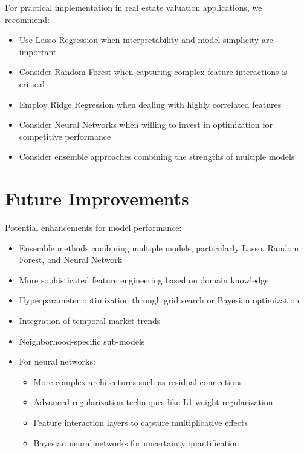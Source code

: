 \documentclass[12pt]{report}
\begin{document}
For practical implementation in real estate valuation applications, we recommend:
\begin{itemize}
    \item Use Lasso Regression when interpretability and model simplicity are important
    \item Consider Random Forest when capturing complex feature interactions is critical
    \item Employ Ridge Regression when dealing with highly correlated features
    \item Consider Neural Networks when willing to invest in optimization for competitive performance
    \item Consider ensemble approaches combining the strengths of multiple models
\end{itemize}

\section{Future Improvements}
Potential enhancements for model performance:
\begin{itemize}
    \item Ensemble methods combining multiple models, particularly Lasso, Random Forest, and Neural Network
    \item More sophisticated feature engineering based on domain knowledge
    \item Hyperparameter optimization through grid search or Bayesian optimization
    \item Integration of temporal market trends
    \item Neighborhood-specific sub-models
    \item For neural networks: 
    \begin{itemize}
        \item More complex architectures such as residual connections
        \item Advanced regularization techniques like L1 weight regularization
        \item Feature interaction layers to capture multiplicative effects
        \item Bayesian neural networks for uncertainty quantification
    \end{itemize}
\end{itemize}
\end{document}
